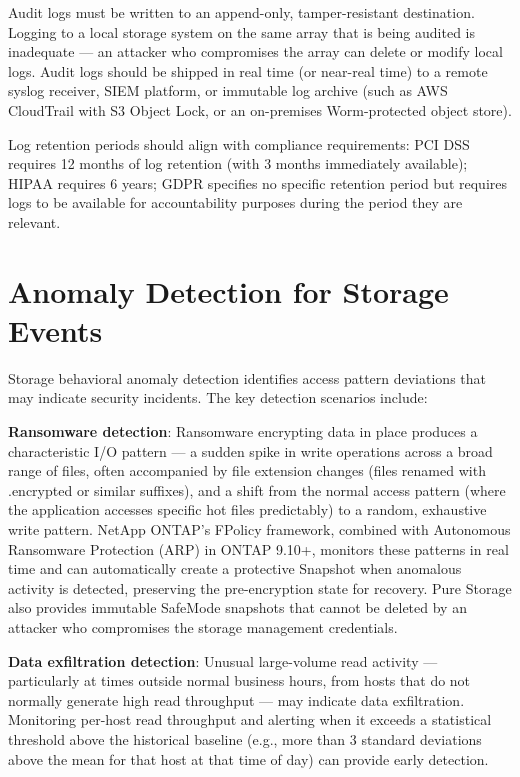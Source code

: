 Audit logs must be written to an append-only, tamper-resistant destination. Logging to a local storage system on the same array that is being audited is inadequate --- an attacker who compromises the array can delete or modify local logs. Audit logs should be shipped in real time (or near-real time) to a remote syslog receiver, SIEM platform, or immutable log archive (such as AWS CloudTrail with S3 Object Lock, or an on-premises Worm-protected object store).

Log retention periods should align with compliance requirements: PCI DSS requires 12 months of log retention (with 3 months immediately available); HIPAA requires 6 years; GDPR specifies no specific retention period but requires logs to be available for accountability purposes during the period they are relevant.

\section{Anomaly Detection for Storage Events}
Storage behavioral anomaly detection identifies access pattern deviations that may indicate security incidents. The key detection scenarios include:

\textbf{Ransomware detection}: Ransomware encrypting data in place produces a characteristic I/O pattern --- a sudden spike in write operations across a broad range of files, often accompanied by file extension changes (files renamed with .encrypted or similar suffixes), and a shift from the normal access pattern (where the application accesses specific hot files predictably) to a random, exhaustive write pattern. NetApp ONTAP's FPolicy framework, combined with Autonomous Ransomware Protection (ARP) in ONTAP 9.10+, monitors these patterns in real time and can automatically create a protective Snapshot when anomalous activity is detected, preserving the pre-encryption state for recovery. Pure Storage also provides immutable SafeMode snapshots that cannot be deleted by an attacker who compromises the storage management credentials.

\textbf{Data exfiltration detection}: Unusual large-volume read activity --- particularly at times outside normal business hours, from hosts that do not normally generate high read throughput --- may indicate data exfiltration. Monitoring per-host read throughput and alerting when it exceeds a statistical threshold above the historical baseline (e.g., more than 3 standard deviations above the mean for that host at that time of day) can provide early detection.

